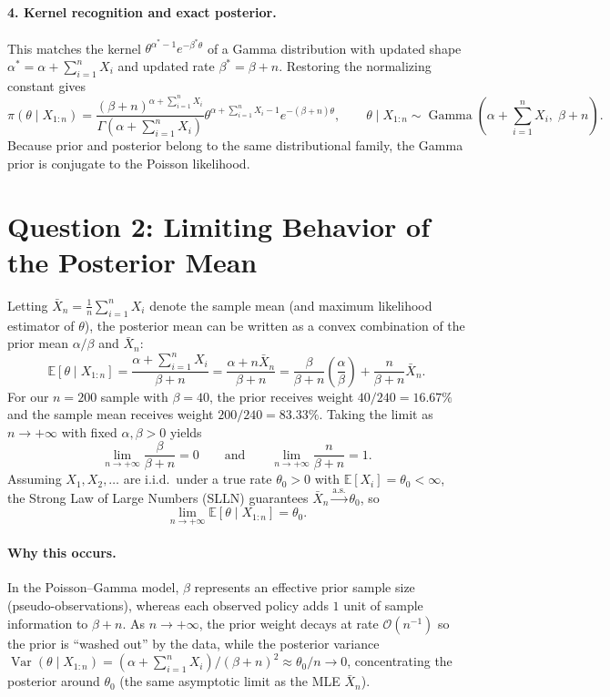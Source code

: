 \documentclass[11pt,a4paper]{article}
\begin{document}
\paragraph{4. Kernel recognition and exact posterior.}
This matches the kernel $\theta^{\alpha^* - 1} e^{-\beta^*\theta}$ of a Gamma distribution with updated shape $\alpha^* = \alpha + \sum_{i=1}^{n} X_i$ and updated rate $\beta^* = \beta + n$. Restoring the normalizing constant gives
\[
\pi(\theta \mid X_{1:n})
= \frac{(\beta + n)^{\alpha + \sum_{i=1}^{n} X_i}}{\Gamma\!\left(\alpha + \sum_{i=1}^{n} X_i\right)}
  \theta^{\alpha + \sum_{i=1}^{n} X_i - 1} e^{-(\beta + n)\theta},
\qquad
\boxed{\theta \mid X_{1:n} \sim \operatorname{Gamma}\!\left(\alpha + \sum_{i=1}^{n} X_i,\; \beta + n\right).}
\]
Because prior and posterior belong to the same distributional family, the Gamma prior is conjugate to the Poisson likelihood.

\section*{Question 2: Limiting Behavior of the Posterior Mean}

Letting $\bar{X}_n = \frac{1}{n}\sum_{i=1}^{n} X_i$ denote the sample mean (and maximum likelihood estimator of $\theta$), the posterior mean can be written as a convex combination of the prior mean $\alpha / \beta$ and $\bar{X}_n$:
\[
\mathbb{E}[\theta \mid X_{1:n}]
= \frac{\alpha + \sum_{i=1}^{n} X_i}{\beta + n}
= \frac{\alpha + n\bar{X}_n}{\beta + n}
= \frac{\beta}{\beta + n}\left(\frac{\alpha}{\beta}\right) + \frac{n}{\beta + n}\bar{X}_n.
\]
For our $n = 200$ sample with $\beta = 40$, the prior receives weight $40/240 = 16.67\%$ and the sample mean receives weight $200/240 = 83.33\%$. Taking the limit as $n \to +\infty$ with fixed $\alpha, \beta > 0$ yields
\[
\lim_{n \to +\infty} \frac{\beta}{\beta + n} = 0
\qquad \text{and} \qquad
\lim_{n \to +\infty} \frac{n}{\beta + n} = 1.
\]
Assuming $X_1, X_2, \dots$ are i.i.d.\ under a true rate $\theta_0 > 0$ with $\mathbb{E}[X_i] = \theta_0 < \infty$, the Strong Law of Large Numbers (SLLN) guarantees $\bar{X}_n \xrightarrow{\text{a.s.}} \theta_0$, so
\[
\boxed{\lim_{n \to +\infty} \mathbb{E}[\theta \mid X_{1:n}] = \theta_0.}
\]

\paragraph{Why this occurs.}
In the Poisson--Gamma model, $\beta$ represents an effective prior sample size (pseudo-observations), whereas each observed policy adds $1$ unit of sample information to $\beta + n$. As $n \to +\infty$, the prior weight decays at rate $\mathcal{O}(n^{-1})$ so the prior is ``washed out'' by the data, while the posterior variance $\operatorname{Var}(\theta \mid X_{1:n}) = (\alpha + \sum_{i=1}^n X_i)/(\beta + n)^2 \approx \theta_0 / n \to 0$, concentrating the posterior around $\theta_0$ (the same asymptotic limit as the MLE $\bar{X}_n$).
\end{document}

